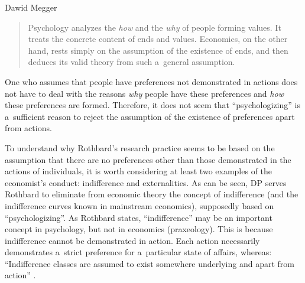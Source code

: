 \begin{artengenv}{Dawid Megger}
\begin{quote}
Psychology analyzes the \textit{how} and the \textit{why} of people forming values. It treats the concrete content of ends and values. Economics, on the other hand, rests simply on the assumption of the existence of ends, and then deduces its valid theory from such a~general assumption. 
\parencite[][pp.296–297]{rothbard_present_2011}%
\end{quote}




One who assumes that people have preferences not demonstrated in actions does not have to deal with the reasons \textit{why} people have these preferences and \textit{how} these preferences are formed. Therefore, it does not seem that ``psychologizing'' is a~sufficient reason to reject the assumption of the existence of preferences apart from actions.



To understand why Rothbard's research practice seems to be based on the assumption that there are no preferences other than those demonstrated in the actions of individuals, it is worth considering at least two examples of the economist's conduct: indifference and externalities. As can be seen, DP serves Rothbard to eliminate from economic theory the concept of indifference (and the indifference curves known in mainstream economics), supposedly based on ``psychologizing''. As Rothbard states, ``indifference'' may be an important concept in psychology, but not in economics (praxeology). This is because indifference cannot be demonstrated in action. Each action necessarily demonstrates a~strict preference for a~particular state of affairs, whereas: ``Indifference classes are assumed to exist somewhere underlying and apart from action'' 
\parencite[][pp.304–305]{rothbard_present_2011}.%





\end{artengenv}
